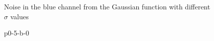 \documentclass[12pt,a4paper]{article}
\begin{document}
\begin{figure}[!h]
	\caption{Noise in the blue channel  from the Gaussian function with different $\sigma$ values}%
	\label{fig:green-sigma}%
\end{figure}


\begin{figure}[!h]
	\centering
	{%
		\setlength{\fboxsep}{1pt}%
		\setlength{\fboxrule}{1pt}%
	}%
	\caption{p0-5-b-0}
	\label{fig:p0-5-b-0}
\end{figure}
\end{document}
